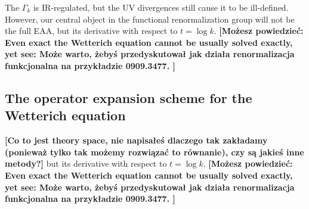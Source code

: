 \documentclass[11pt, a4paper]{article}
\newcommand{\jhkbf}[1]{\textbf{\color{red} [#1]}}
\newcommand{\jhkbf}[1]{\textbf{\color{red} [#1]}}
\begin{document}
The $\Gamma_k$ is IR-regulated, but the UV divergences still cause it to be ill-defined. 
However, our central object in the functional renormalization group will not be the full EAA, 
but its derivative with respect to $t = \log{k}$. 
\jhkbf{Możesz powiedzieć: Even exact the Wetterich equation cannot be usually solved exactly, yet see:
Może warto, żebyś przedyskutował jak działa renormalizacja funkcjonalna na przykładzie 0909.3477.
}
\subsection{The operator expansion scheme for the Wetterich equation}
\jhkbf{Co to jest theory space, nie napisałeś dlaczego tak zakładamy (ponieważ tylko tak możemy rozwiązać to równanie), czy są jakieś inne metody?}
but its derivative with respect to $t = \log{k}$. 
\jhkbf{Możesz powiedzieć: Even exact the Wetterich equation cannot be usually solved exactly, yet see:
Może warto, żebyś przedyskutował jak działa renormalizacja funkcjonalna na przykładzie 0909.3477.
}
\end{document}
